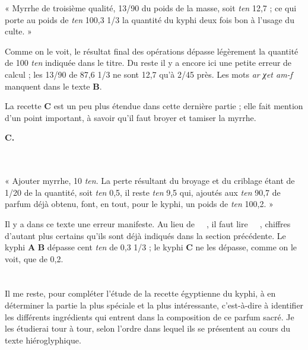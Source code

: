 \documentclass[a4paper, 11pt, oneside, landscape]{article}
\newcommand*\hieroAAAB{}
\newcommand*\hieroAAAE{}
\newcommand*\hieroAAAM{}
\newcommand*\hieroAAAR{}
\newcommand*\hieroAADF{}
\newcommand*\hieroAAEB{}
\newcommand*\hieroAAFI{}
\newcommand*\hieroAAGA{}
\newcommand*\hieroAAGM{}
\newcommand*\hieroAAGS{\raisebox{0.4ex}{}}
\newcommand*\hieroAAHC{\raisebox{1ex}{}}
\newcommand*\hieroAAHO{\raisebox{0.6ex}{}}
\newcommand*\hieroAAII{}
\newcommand*\hieroAAIM{}
\newcommand*\hieroAAJB{}
\newcommand*\hieroAAJG{}
\newcommand*\hieroAAJV{}
\newcommand*\hieroAAMQ{}
\newcommand*\hieroAAOU{}
\newcommand*\hieroAAPQ{}
\newcommand*\hieroAAQZ{}
\newcommand*\hieroAARL{\raisebox{0.4ex}{}}
\newcommand*\hieroAASM{}
\newcommand*\hieroAASO{}
\newcommand*\hieroAASZ{}
\newcommand*\hieroAAUG{}
\newcommand*\hieroAAUH{}
\newcommand*\hieroAAUI{}
\newcommand*\hieroAAUJ{}
\newcommand*\hieroAAUK{}
\newcommand*\hieroAAUL{}
\newcommand*\hieroAAUM{}
\newcommand*\hieroAAUN{}
\newcommand*\hieroAAUO{}
\newcommand*\hieroAAUP{}
\begin{document}
« Myrrhe de troisième qualité, 13/90 du poids de la masse, soit \emph{ten} 12,7 ; ce qui porte au poids de \emph{ten} 100,3 1/3 la quantité du kyphi deux fois bon à l'usage du culte. »

Comme on le voit, le résultat final des opérations dépasse légèrement la quantité de 100 \emph{ten} indiquée dans le titre. Du reste il y a encore ici une petite erreur de calcul ; les 13/90 de 87,6 1/3 ne sont 12,7 qu'à 2/45 près. Les mots \emph{ar χet am-f} manquent dans le texte \textbf{B}.

La recette \textbf{C} est un peu plus étendue dans cette dernière partie ; elle fait mention d'un point important, à savoir qu'il faut broyer et tamiser la myrrhe.

\hspace*{10mm}\textbf{C.}\hspace*{5mm} $\hieroAAUG\:\hieroAADF\:\hieroAAAM\:\hieroAAAM\:\hieroAAAR\:\hieroAASO\:\hieroAAFI\:\hieroAAHC\:\hieroAAAB\:\hieroAAUH\:\hieroAAQZ\:\hieroAAUI\:\hieroAAIM\:\hieroAAUJ\:\hieroAAGS\:\hieroAAPQ$ \\\hspace*{10mm} $\hieroAAUK\:\hieroAAGA\:\hieroAAJB\:\hieroAAUL\:\hieroAARL\:\hieroAASZ\:\hieroAAUM\:\hieroAAGA\:\hieroAAJB\:\hieroAAHO\:\hieroAAEB\:\hieroAAII\:\hieroAAAE\:\hieroAAAR\:\hieroAAUN\:\hieroAASM\:\hieroAAGA\:\hieroAAJG\:\hieroAAUO\:\hieroAAAR$ \\\hspace*{10mm} $\hieroAAUP\:\hieroAAGA\:\hieroAAJV$

« Ajouter myrrhe, 10 \emph{ten}. La perte résultant du broyage et du criblage étant de 1/20 de la quantité, soit \emph{ten} 0,5, il reste \emph{ten} 9,5 qui, ajoutés aux \emph{ten} 90,7 de parfum déjà obtenu, font, en tout, pour le kyphi, un poids de \emph{ten} 100,2. »

Il y a dans ce texte une erreur manifeste. Au lieu de $\hieroAAUN\:\hieroAAMQ\:\hieroAAMQ\:\hieroAAMQ\:\hieroAAGA\:\hieroAAJG$, il faut lire $\hieroAAOU\:\hieroAAMQ\:\hieroAAMQ\:\hieroAAMQ\:\hieroAAGA\:\hieroAAGM$, chiffres d'autant plus certains qu'ils sont déjà indiqués dans la section précédente. Le kyphi \textbf{A} \textbf{B} dépasse cent \emph{ten} de 0,3 1/3 ; le kyphi \textbf{C} ne les dépasse, comme on le voit, que de 0,2.
\clearpage
\section{}
\paragraph{}
Il me reste, pour compléter l'étude de la recette égyptienne du kyphi, à en déterminer la partie la plus spéciale et la plus intéressante, c'est-à-dire à identifier les différents ingrédients qui entrent dans la composition de ce parfum sacré. Je les étudierai tour à tour, selon l'ordre dans lequel ils se présentent au cours du texte hiéroglyphique.
\end{document}
